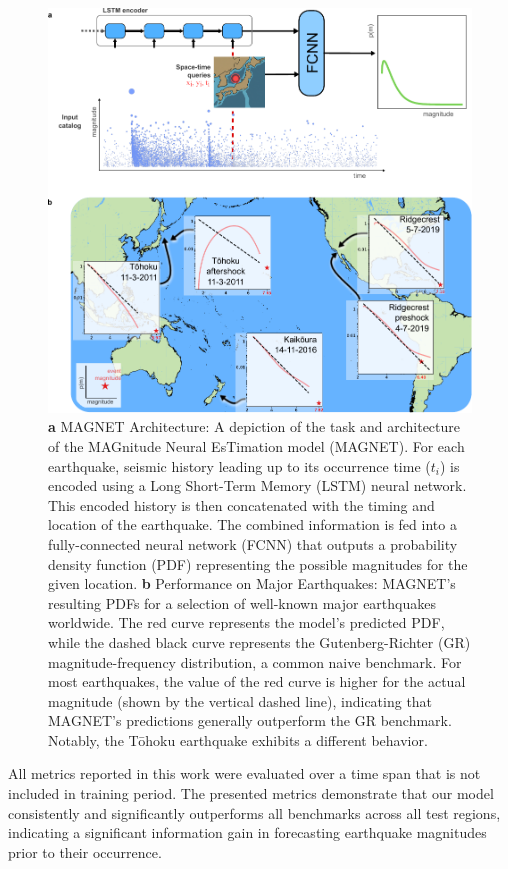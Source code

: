 \documentclass[pdflatex]{sn-jnl}
\begin{document}
\begin{figure}[h!]
	\centering
        \includegraphics[width=1\textwidth]{figures/intro_fig.pdf}
	\caption{\textbf{a} MAGNET Architecture: A depiction of the task and architecture of the MAGnitude Neural EsTimation model (MAGNET). For each earthquake, seismic history leading up to its occurrence time ($t_i$) is encoded using a Long Short-Term Memory (LSTM) neural network. This encoded history is then concatenated with the timing and location of the earthquake. The combined information is fed into a fully-connected neural network (FCNN) that outputs a probability density function (PDF) representing the possible magnitudes for the given location. \textbf{b} Performance on Major Earthquakes: MAGNET's resulting PDFs for a selection of well-known major earthquakes worldwide. The red curve represents the model's predicted PDF, while the dashed black curve represents the Gutenberg-Richter (GR) magnitude-frequency distribution, a common naive benchmark.  For most earthquakes, the value of the red curve is higher for the actual magnitude (shown by the vertical dashed line), indicating that MAGNET's predictions generally outperform the GR benchmark. Notably, the Tōhoku earthquake exhibits a different behavior.
    }
\label{fig:intro_fig}
\end{figure}

All metrics reported in this work were evaluated over a time span that is not included in training period. The presented metrics demonstrate that our model consistently and significantly outperforms all benchmarks across all test regions, indicating a significant information gain in forecasting earthquake magnitudes prior to their occurrence.
\end{document}
